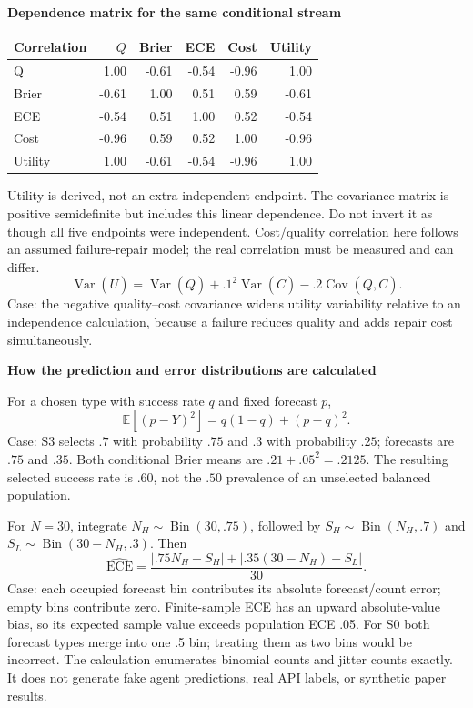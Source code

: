\documentclass[10pt,a4paper]{article}
\newcommand{\lead}[1]{\vspace{3pt}\textbf{#1}\par}
\begin{document}
\lead{Dependence matrix for the same conditional stream}
\begin{center}\small
\begin{tabular*}{\linewidth}{@{\extracolsep{\fill}}lrrrrr@{}}\toprule
Correlation & $Q$ & Brier & ECE & Cost & Utility\\\midrule
Q & 1.00 & -0.61 & -0.54 & -0.96 & 1.00\\
Brier & -0.61 & 1.00 & 0.51 & 0.59 & -0.61\\
ECE & -0.54 & 0.51 & 1.00 & 0.52 & -0.54\\
Cost & -0.96 & 0.59 & 0.52 & 1.00 & -0.96\\
Utility & 1.00 & -0.61 & -0.54 & -0.96 & 1.00\\
\bottomrule\end{tabular*}\end{center}
Utility is derived, not an extra independent endpoint. The covariance matrix
is positive semidefinite but includes this linear dependence. Do not invert
it as though all five endpoints were independent. Cost/quality correlation
here follows an assumed failure-repair model; the real correlation must be
measured and can differ.
\[
 \operatorname{Var}(\bar U)=\operatorname{Var}(\bar Q)
 +.1^2\operatorname{Var}(\bar C)-.2\operatorname{Cov}(\bar Q,\bar C).
\]
Case: the negative quality--cost covariance widens utility variability relative
to an independence calculation, because a failure reduces quality and adds
repair cost simultaneously.

\lead{How the prediction and error distributions are calculated}
For a chosen type with success rate $q$ and fixed forecast $p$,
\[
 \mathbb E[(p-Y)^2]=q(1-q)+(p-q)^2.
\]
Case: S3 selects $.7$ with probability $.75$ and $.3$ with probability $.25$;
forecasts are $.75$ and $.35$. Both conditional Brier means are
$.21+.05^2=.2125$. The resulting selected success rate is $.60$, not the
$.50$ prevalence of an unselected balanced population.

For $N=30$, integrate $N_H\sim\operatorname{Bin}(30,.75)$, followed by
$S_H\sim\operatorname{Bin}(N_H,.7)$ and
$S_L\sim\operatorname{Bin}(30-N_H,.3)$. Then
\[
 \widehat{\mathrm{ECE}}=
 \frac{|.75N_H-S_H|+|.35(30-N_H)-S_L|}{30}.
\]
Case: each occupied forecast bin contributes its absolute forecast/count error;
empty bins contribute zero. Finite-sample ECE has an upward absolute-value bias,
so its expected sample value exceeds population ECE .05. For S0 both forecast
types merge into one .5 bin; treating them as two bins would be incorrect.
The calculation enumerates binomial counts and jitter counts exactly. It does
not generate fake agent predictions, real API labels, or synthetic paper results.
\end{document}
